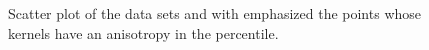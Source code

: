 \begin{figure}
\begin{subfigure}{0.23\textwidth}
			\caption{\anisotropyTwo}
			\label{fig:discussion:anisotropy:anisotropy2}
		\end{subfigure}	
		\caption{Scatter plot of the data sets  \anisotropyOne and  \anisotropyTwo with emphasized the points whose kernels have an anisotropy in the  percentile.}
		\label{fig:discussion:anisotropy:anisotropy}
	\end{figure}

